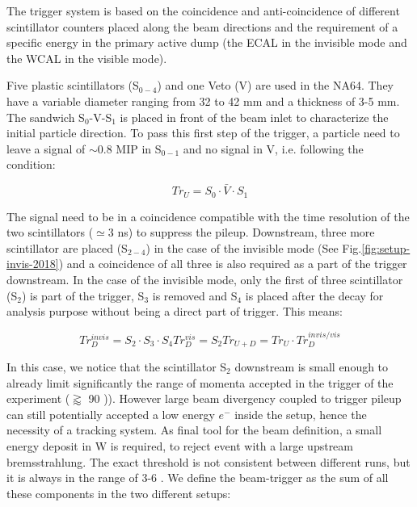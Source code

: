 The trigger system is based on the coincidence and anti-coincidence of different scintillator counters placed along the beam directions and the requirement of a specific energy in the primary active dump (the ECAL in the invisible mode and the WCAL in the visible mode).

Five plastic scintillators (S$_{0-4}$) and one Veto (V) are used in the NA64. They have a variable diameter ranging from 32 to 42 \si{mm} and a thickness of 3-5 \si{mm}. The sandwich S$_0$-V-S$_1$ is placed in front of the beam inlet to characterize the initial particle direction. To pass this first step of the trigger, a particle need to leave a signal of $\sim$0.8 MIP in S$_{0-1}$ and no signal in V, i.e. following the condition:

\begin{equation}
  \label{eq:trigger-upstream}
  Tr_U = S_0 \cdot \bar{V} \cdot S_1
\end{equation}

The signal need to be in a coincidence compatible with the time resolution of the two scintillators ($\simeq$3 \si{ns}) to suppress the pileup. Downstream, three more scintillator are placed (S$_{2-4}$) in the case of the invisible mode (See Fig.\ref{fig:setup-invis-2018}) and a coincidence of all three is also required as a part of the trigger downstream. In the case of the invisible mode, only the first of three scintillator (S$_2$) is part of the trigger, S$_3$ is removed and S$_4$ is placed after the decay for analysis purpose without being a direct part of trigger. This means:

\begin{equation}
  \label{eq:trigger-downstream}
  Tr^{invis}_D = S_2 \cdot S_3 \cdot S_4
  Tr^{vis}_D = S_2
  Tr_{U+D} = Tr_U \cdot Tr^{invis/vis}_D
\end{equation}

In this case, we notice that the scintillator S$_2$ downstream is small enough to already limit significantly the range of momenta accepted in the trigger of the experiment ($\gtrapprox$ 90 \si{\gev})). However large beam divergency coupled to trigger pileup can still potentially accepted a low energy $e^-$ inside the setup, hence the necessity of a tracking system. As final tool for the beam definition, a small energy deposit in W is required, to reject event with a large upstream bremsstrahlung. The exact threshold is not consistent between different runs, but it is always in the range of 3-6 \si{\gev}. We define the beam-trigger as the sum of all these components in the two different setups:

